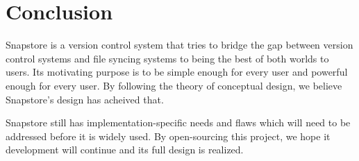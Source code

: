 \chapter{Conclusion}

Snapstore is a version control system that tries to bridge the gap between version control systems and file syncing systems to being the best of both worlds to users. Its motivating purpose is to be simple enough for every user and powerful enough for every user. By following the theory of conceptual design, we believe Snapstore's design has acheived that.

Snapstore still has implementation-specific needs and flaws which will need to be addressed before it is widely used. By open-sourcing this project, we hope it development will continue and its full design is realized. 